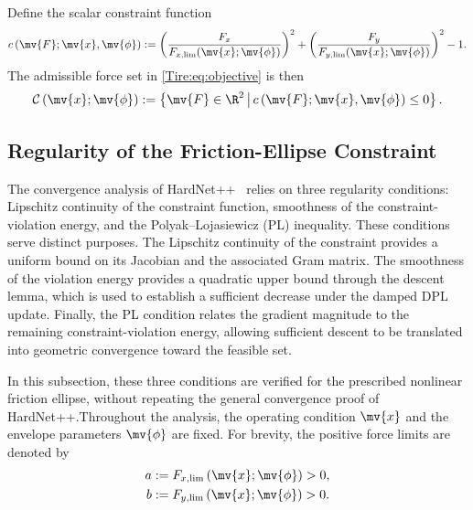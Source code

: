 Define the scalar constraint function
\begin{equation}
	\label{Tire:eq:friction:ellipse:rewritten}
	c
	\left(
	\mv{F};\mv{x},\mv{\phi}
	\right)
	:=
	\left(
	\frac{
			F_x
		}{
			F_{x,\lim}(\mv{x};\mv{\phi})
		}
	\right)^2
	+
	\left(
	\frac{
			F_y
		}{
			F_{y,\lim}(\mv{x};\mv{\phi})
		}
	\right)^2
	-
	1
	.
\end{equation}
The admissible force set in \eqref{Tire:eq:objective} is then
\begin{equation}
	\label{Tire:eq:general:set}
	\mathcal{C}
	\left(
	\mv{x};\mv{\phi}
	\right)
	:=
	\left\{
	\mv{F}\in\R^2
	\,\middle|\,
	c
	\left(
	\mv{F};\mv{x},\mv{\phi}
	\right)
	\leq
	0
	\right\}
	.
\end{equation}

\subsection{Regularity of the Friction-Ellipse Constraint}
\label{Tire:sec:regularity}

The convergence analysis of HardNet++~\cite{Goertzen:2026aa} relies on three
regularity conditions: Lipschitz continuity of the constraint function,
smoothness of the constraint-violation energy, and the Polyak--Lojasiewicz (PL)
inequality. These conditions serve distinct purposes. The Lipschitz continuity
of the constraint provides a uniform bound on its Jacobian and the associated
Gram matrix. The smoothness of the violation energy provides a quadratic upper
bound through the descent lemma, which is used to establish a sufficient
decrease under the damped DPL update. Finally, the PL condition relates the
gradient magnitude to the remaining constraint-violation energy, allowing
sufficient descent to be translated into geometric convergence toward the
feasible set.

In this subsection, these three conditions are verified for the prescribed
nonlinear friction ellipse, without repeating the general convergence proof of
HardNet++.Throughout the analysis, the operating condition $\mv{x}$ and the envelope parameters $\mv{\phi}$ are fixed. For brevity, the positive force
limits are denoted by
\begin{equation}
	\begin{aligned}
		a
		 & :=
		F_{x,\lim}
		\left(
		\mv{x};\mv{\phi}
		\right)
		>0
		,
		\\
		b
		 & :=
		F_{y,\lim}
		\left(
		\mv{x};\mv{\phi}
		\right)
		>0
		.
	\end{aligned}
\end{equation}

